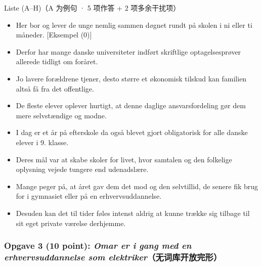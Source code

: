 \begin{grammatikbox}{Liste (A--H)（A 为例句 · 5 项作答 + 2 项多余干扰项）}
\small
\begin{itemize}[leftmargin=2.2em, itemsep=0.35em]
  \item[\textbf{\color{NCDGray}A.}] \textcolor{NCDGray}{Her bor og lever de unge nemlig sammen døgnet rundt på skolen i ni eller ti måneder.} {\footnotesize\color{NCDRed}[Eksempel (0)]}
  \item[\textbf{B.}] Derfor har mange danske universiteter indført skriftlige optagelsesprøver allerede tidligt om foråret.
  \item[\textbf{C.}] Jo lavere forældrene tjener, desto større et økonomisk tilskud kan familien altså få fra det offentlige.
  \item[\textbf{D.}] De fleste elever oplever hurtigt, at denne daglige ansvarsfordeling gør dem mere selvstændige og modne.
  \item[\textbf{E.}] I dag er et år på efterskole da også blevet gjort obligatorisk for alle danske elever i 9. klasse.
  \item[\textbf{F.}] Deres mål var at skabe skoler for livet, hvor samtalen og den folkelige oplysning vejede tungere end udenadslære.
  \item[\textbf{G.}] Mange peger på, at året gav dem det mod og den selvtillid, de senere fik brug for i gymnasiet eller på en erhvervsuddannelse.
  \item[\textbf{H.}] Desuden kan det til tider føles intenst aldrig at kunne trække sig tilbage til sit eget private værelse derhjemme.
\end{itemize}
\end{grammatikbox}

\subsubsection*{Opgave 3 (10 point): \textit{Omar er i gang med en erhvervsuddannelse som elektriker}（无词库开放完形）}

